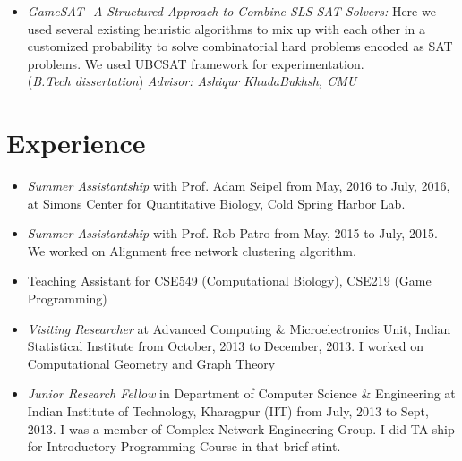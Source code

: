 \documentclass{res}
\begin{document}
\begin{resume}
\begin{itemize}
 \item 
 {{\it GameSAT- A Structured Approach to Combine SLS SAT Solvers:}} Here we used several existing heuristic algorithms to mix up with each other in a customized probability to solve combinatorial hard problems encoded as SAT problems. We used UBCSAT framework for experimentation. \\
({\it B.Tech dissertation}) {\it Advisor: Ashiqur KhudaBukhsh, CMU}

%
% 
 
 \end{itemize}
 
            
\section{Experience}
\begin{itemize}
\item {\it Summer Assistantship} with Prof. Adam Seipel from May, 2016 to July, 2016, at Simons Center for Quantitative Biology, Cold Spring Harbor Lab. 
\item {\it Summer Assistantship} with Prof. Rob Patro from May, 2015 to July, 2015. We worked on Alignment free network clustering algorithm.
\item  Teaching Assistant for CSE549 (Computational Biology), CSE219 (Game Programming)
\item {\it Visiting Researcher} at Advanced Computing \& Microelectronics Unit, Indian Statistical Institute from October, 2013 to December, 
2013. I worked on Computational Geometry and Graph Theory
\item {\it Junior Research Fellow} in Department of Computer Science \& Engineering at Indian Institute of Technology, Kharagpur (IIT) 
from July, 2013 to Sept, 2013. I was a member of Complex Network Engineering Group. I did TA-ship for Introductory Programming 
Course in that brief stint. 
\end{itemize}


\end{resume}
\end{document}
